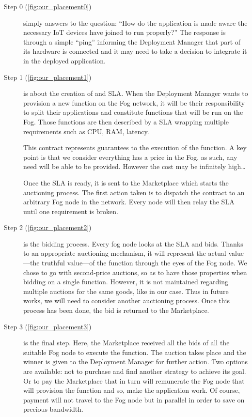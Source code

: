 \begin{description}
	\item[Step 0 (\cref{fig:our_placement0})]{simply answers to the question: “How do the application is made aware the necessary \gls{IoT} devices have joined to run properly?”
		The response is through a simple “ping” informing the Deployment Manager that part of its hardware is connected and it may need to take a decision to integrate it in the deployed application.
	}
	\item[Step 1 (\cref{fig:our_placement1})] {is about the creation of and \gls{SLA}. When the Deployment Manager wants to provision a new function on the Fog network, it will be their responsibility to split their applications and constitute functions that will be run on the Fog. Those functions are then described by a \gls{SLA} wrapping multiple requirements such as CPU, RAM, latency.
		
		This contract represents guarantees to the execution of the function. A key point is that we consider everything has a price in the Fog, as such, any need will be able to be provided. However the cost may be infinitely high…
		
		Once the \gls{SLA} is ready, it is sent to the Marketplace which starts the auctioning process. The first action taken is to dispatch the contract to an arbitrary Fog node in the network. Every node will then relay the \gls{SLA} until one requirement is broken.
	}
	\item[Step 2 (\cref{fig:our_placement2})] {is the bidding process. Every fog node looks at the \gls{SLA} and bids. Thanks to an appropriate auctioning mechanism, it will represent the actual value—the truthful value—of the function through the eyes of the Fog node. We chose to go with second-price auctions, so as to have those properties when bidding on a single function. However, it is not maintained regarding multiple auctions for the same goods, like in our case. Thus in future works, we will need to consider another auctioning process. Once this process has been done, the bid is returned to the Marketplace.}
	\item[Step 3 (\cref{fig:our_placement3})] {is the final step. Here, the Marketplace received all the bids of all the suitable Fog node to execute the function. The auction takes place and the winner is given to the Deployment Manager for further action. Two options are available: not to purchase and find another strategy to achieve its goal. Or to pay the Marketplace that in turn will remunerate the Fog node that will provision the function and so, make the application work. Of course, payment will not travel to the Fog node but in parallel in order to save on precious bandwidth.}
\end{description}

